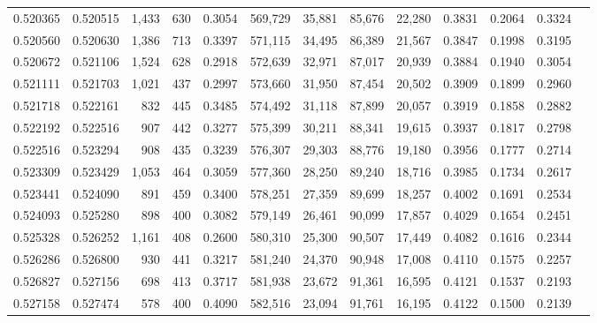 \begin{tabular}{rrrrrrrrrrrrr}
0.520365 & 0.520515 &  1,433 &   630 &                                     0.3054 & 569,729 &  35,881 &  85,676 &  22,280 & 0.3831 & 0.2064 & 0.3324 \\
0.520560 & 0.520630 &  1,386 &   713 &                                     0.3397 & 571,115 &  34,495 &  86,389 &  21,567 & 0.3847 & 0.1998 & 0.3195 \\
0.520672 & 0.521106 &  1,524 &   628 &                                     0.2918 & 572,639 &  32,971 &  87,017 &  20,939 & 0.3884 & 0.1940 & 0.3054 \\
0.521111 & 0.521703 &  1,021 &   437 &                                     0.2997 & 573,660 &  31,950 &  87,454 &  20,502 & 0.3909 & 0.1899 & 0.2960 \\
0.521718 & 0.522161 &    832 &   445 &                                     0.3485 & 574,492 &  31,118 &  87,899 &  20,057 & 0.3919 & 0.1858 & 0.2882 \\
0.522192 & 0.522516 &    907 &   442 &                                     0.3277 & 575,399 &  30,211 &  88,341 &  19,615 & 0.3937 & 0.1817 & 0.2798 \\
0.522516 & 0.523294 &    908 &   435 &                                     0.3239 & 576,307 &  29,303 &  88,776 &  19,180 & 0.3956 & 0.1777 & 0.2714 \\
0.523309 & 0.523429 &  1,053 &   464 &                                     0.3059 & 577,360 &  28,250 &  89,240 &  18,716 & 0.3985 & 0.1734 & 0.2617 \\
0.523441 & 0.524090 &    891 &   459 &                                     0.3400 & 578,251 &  27,359 &  89,699 &  18,257 & 0.4002 & 0.1691 & 0.2534 \\
0.524093 & 0.525280 &    898 &   400 &                                     0.3082 & 579,149 &  26,461 &  90,099 &  17,857 & 0.4029 & 0.1654 & 0.2451 \\
0.525328 & 0.526252 &  1,161 &   408 &                                     0.2600 & 580,310 &  25,300 &  90,507 &  17,449 & 0.4082 & 0.1616 & 0.2344 \\
0.526286 & 0.526800 &    930 &   441 &                                     0.3217 & 581,240 &  24,370 &  90,948 &  17,008 & 0.4110 & 0.1575 & 0.2257 \\
0.526827 & 0.527156 &    698 &   413 &                                     0.3717 & 581,938 &  23,672 &  91,361 &  16,595 & 0.4121 & 0.1537 & 0.2193 \\
0.527158 & 0.527474 &    578 &   400 &                                     0.4090 & 582,516 &  23,094 &  91,761 &  16,195 & 0.4122 & 0.1500 & 0.2139 \\

\end{tabular}
